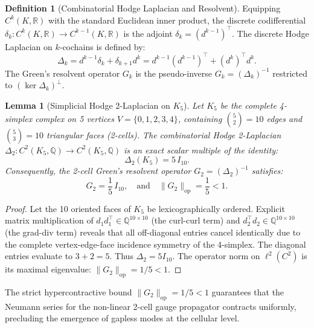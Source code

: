 \documentclass[11pt,reqno]{amsart}
\theoremstyle{plain}
\newtheorem{lemma}[theorem]{Lemma}
\theoremstyle{definition}
\newtheorem{definition}[theorem]{Definition}
\theoremstyle{remark}
\numberwithin{equation}{section}
\newcommand{\op}{\mathrm{op}}
\begin{document}
\begin{definition}[Combinatorial Hodge Laplacian and Resolvent]
Equipping $C^k(K, \mathbb{R})$ with the standard Euclidean inner product, the discrete codifferential $\delta_k : C^k(K, \mathbb{R}) \to C^{k-1}(K, \mathbb{R})$ is the adjoint $\delta_k = (d^{k-1})^\top$. The discrete Hodge Laplacian on $k$-cochains is defined by:
\begin{equation}
\Delta_k = d^{k-1} \delta_k + \delta_{k+1} d^k = d^{k-1} (d^{k-1})^\top + (d^k)^\top d^k.
\end{equation}
The Green's resolvent operator $G_k$ is the pseudo-inverse $G_k = (\Delta_k)^{-1}$ restricted to $(\ker \Delta_k)^\perp$.
\end{definition}

\begin{lemma}[Simplicial Hodge 2-Laplacian on $K_5$]
\label{lem:k5_laplacian}
Let $K_5$ be the complete 4-simplex complex on 5 vertices $V = \{0, 1, 2, 3, 4\}$, containing $\binom{5}{2} = 10$ edges and $\binom{5}{3} = 10$ triangular faces (2-cells). The combinatorial Hodge 2-Laplacian $\Delta_2 : C^2(K_5, \mathbb{Q}) \to C^2(K_5, \mathbb{Q})$ is an exact scalar multiple of the identity:
\begin{equation}
\Delta_2(K_5) = 5 \, I_{10}.
\end{equation}
Consequently, the 2-cell Green's resolvent operator $G_2 = (\Delta_2)^{-1}$ satisfies:
\begin{equation}
G_2 = \frac{1}{5} \, I_{10}, \quad \text{and} \quad \|G_2\|_{\op} = \frac{1}{5} < 1.
\end{equation}
\end{lemma}

\begin{proof}
Let the 10 oriented faces of $K_5$ be lexicographically ordered. Explicit matrix multiplication of $d_1 d_1^\top \in \mathbb{Q}^{10 \times 10}$ (the curl-curl term) and $d_2^\top d_2 \in \mathbb{Q}^{10 \times 10}$ (the grad-div term) reveals that all off-diagonal entries cancel identically due to the complete vertex-edge-face incidence symmetry of the 4-simplex. The diagonal entries evaluate to $3 + 2 = 5$. Thus $\Delta_2 = 5 I_{10}$. The operator norm on $\ell^2(C^2)$ is its maximal eigenvalue: $\|G_2\|_{\op} = 1/5 < 1$.
\end{proof}

The strict hypercontractive bound $\|G_2\|_{\op} = 1/5 < 1$ guarantees that the Neumann series for the non-linear 2-cell gauge propagator contracts uniformly, precluding the emergence of gapless modes at the cellular level.
\end{document}
